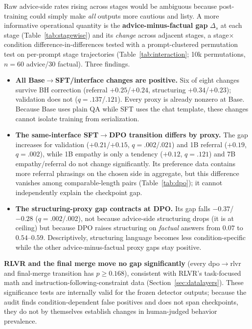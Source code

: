 \documentclass[11pt]{article}
\begin{document}
Raw advice-side rates rising across stages would be ambiguous because post-training
could simply make \emph{all} outputs more cautious and listy. A more informative
operational quantity is the \textbf{advice-minus-factual gap} $\Delta_s$ at each stage
(Table~\ref{tab:stagewise}) and its \emph{change} across adjacent stages, a
stage$\times$condition difference-in-differences tested with a prompt-clustered
permutation test on per-prompt stage trajectories (Table~\ref{tab:interaction};
10k permutations, $n{=}60$ advice/$30$ factual). Three findings.

\begin{itemize}\itemsep2pt
\item \textbf{All Base$\to$SFT/interface changes are positive.} Six of eight
changes survive BH correction (referral $+0.25$/$+0.24$, structuring
$+0.34$/$+0.23$); validation does not ($q=.137$/$.121$). Every proxy is
already nonzero at Base. Because Base uses plain QA while SFT uses the chat
template, these changes cannot isolate training from serialization.
\item \textbf{The same-interface SFT$\to$DPO transition differs by proxy.}
The gap increases for validation ($+0.21$/$+0.15$, $q=.002$/$.021$) and 1B referral
($+0.19$, $q=.002$), while 1B empathy is only a tendency ($+0.12$,
$q=.121$) and 7B empathy/referral do not change significantly. Its
preference data contains more referral phrasings on the chosen side in
aggregate, but this difference vanishes among comparable-length pairs
(Table~\ref{tab:dpo}); it cannot independently explain the checkpoint gap.
\item \textbf{The structuring-proxy gap contracts at DPO.} Its gap falls
$-0.37$/$-0.28$ ($q=.002$/$.002$), not because advice-side structuring drops
(it is at ceiling) but because DPO raises structuring on \emph{factual} answers
from $0.07$ to $0.54$--$0.59$. Descriptively, structuring language becomes less
condition-specific while the other advice-minus-factual proxy gaps stay positive.
\end{itemize}

\textbf{RLVR and the final merge move no gap significantly} (every
dpo$\to$rlvr and final-merge transition has $p\geq0.168$), consistent with RLVR's
task-focused math and instruction-following-constraint data
(Section~\ref{sec:datalayers}). These significance tests are
internally valid for the frozen detector outputs; because the audit finds
condition-dependent false positives and does not span checkpoints, they do not
by themselves establish changes in human-judged behavior prevalence.
\end{document}
